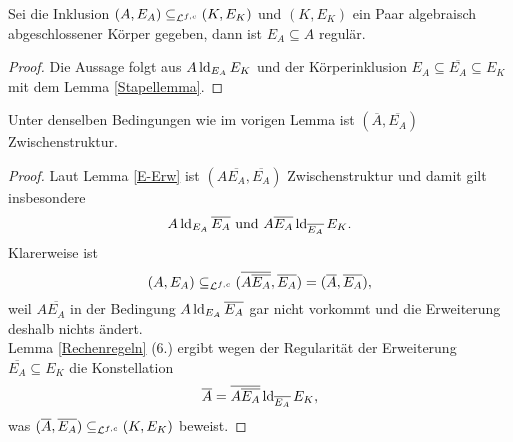     \begin{lemma}\label{Unterstruktur regulär}
    	Sei die Inklusion $(A,E_A)\subseteq_{\mathcal{L}^{f,c}}(K,E_K)$ und $(K,E_K)$ ein Paar algebraisch abgeschlossener Körper gegeben, dann ist $E_A\subseteq A$ regulär.
    \end{lemma}
    \begin{proof}
    	Die Aussage folgt aus $A\operatorname{ld}_{E_A}E_K$ und der Körperinklusion $E_A\subseteq\overline{E_A}\subseteq E_K$ mit dem Lemma \ref{Stapellemma}.
    \end{proof}
    
    \begin{lemma}\label{alg Abschl}
    	Unter denselben Bedingungen wie im vorigen Lemma ist $(\overline{A},\overline{E_A})$ Zwischenstruktur.
    \end{lemma}
    \begin{proof}
    	Laut Lemma \ref{E-Erw} ist $(A\overline{E_A},\overline{E_A})$ Zwischenstruktur und damit gilt insbesondere $$A\operatorname{ld}_{E_A}\overline{E_A}\text{ und }A\overline{E_A}\operatorname{ld}_{\overline{E_A}}E_K.$$ Klarerweise ist $$(A,E_A)\subseteq_{\mathcal{L}^{f,c}}(\overline{A\overline{E_A}},\overline{E_A})=(\overline{A},\overline{E_A}),$$ weil $A\overline{E_A}$ in der Bedingung $A\operatorname{ld}_{E_A}\overline{E_A}$ gar nicht vorkommt und die Erweiterung deshalb nichts ändert.\\
    	Lemma \ref{Rechenregeln} (6.) ergibt wegen der Regularität der Erweiterung $\overline{E_A}\subseteq E_K$ die Konstellation $$\overline{A}=\overline{A\overline{E_A}}\operatorname{ld}_{\overline{E_A}}E_K,$$ was $(\overline{A},\overline{E_A})\subseteq_{\mathcal{L}^{f,c}}(K,E_K)$ beweist.
    \end{proof}
    
